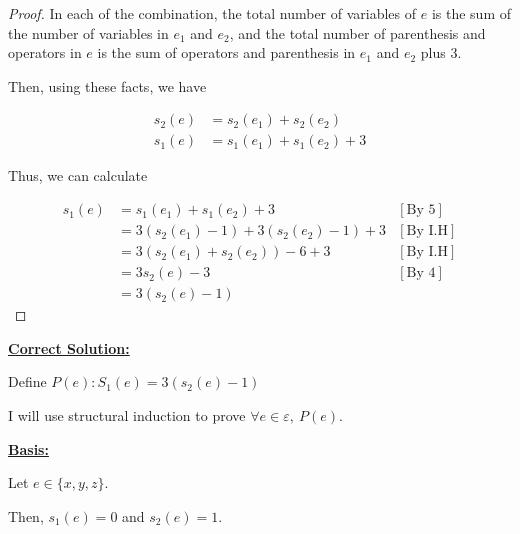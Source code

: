 \documentclass[12pt]{article}
\begin{document}
\begin{itemize}
\begin{proof}
    \bigskip

    In each of the combination, the total number of variables of $e$
    is the sum of the number of variables in $e_1$ and $e_2$, and the
    total number of parenthesis and operators in $e$ is the sum of
    operators and parenthesis in $e_1$ and $e_2$ plus 3.

    \bigskip

    Then, using these facts, we have

    \bigskip

    \begin{align}
        s_2(e) &= s_2(e_1) + s_2(e_2)\\
        s_1(e) &= s_1(e_1) + s_1(e_2) + 3
    \end{align}

    \bigskip

    Thus, we can calculate

    \begin{align}
        s_1(e) &= s_1(e_1) + s_1(e_2) + 3 & [\text{By 5}]\\
        &= 3(s_2(e_1) - 1) + 3(s_2(e_2) - 1) + 3 & [\text{By I.H}]\\
        &= 3(s_2(e_1) + s_2(e_2)) - 6 + 3 & [\text{By I.H}]\\
        &= 3s_2(e) - 3 & [\text{By 4}]\\
        &= 3(s_2(e) - 1)
    \end{align}

    \end{proof}

    \bigskip

    \begin{mdframed}
        \underline{\textbf{Correct Solution:}}

        \bigskip

        Define $P(e):S_1(e) = 3(s_2(e) - 1)$

        \bigskip

        I will use structural induction to prove $\forall e \in \varepsilon,\:P(e)$.

        \bigskip

        \underline{\textbf{Basis:}}

        \bigskip

        Let \color{red}$e \in \{x,y,z\}$\color{black}.

        \bigskip

        Then, $s_1(e) = 0$ and $s_2(e) = 1$.

        \bigskip


\end{mdframed}
\end{itemize}
\end{document}
